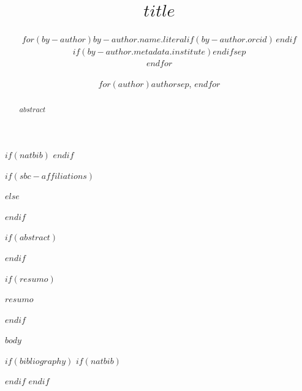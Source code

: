 \documentclass[12pt]{article}
\title{$title$}
\author{$for(by-author)$$by-author.name.literal$$if(by-author.orcid)$\,\orcidlink{$by-author.orcid$}$endif$$if(by-author.metadata.institute)$\inst{$by-author.metadata.institute$}$endif$$sep$\\
$endfor$}
\author{$for(author)$$author$$sep$, $endfor$}
\makeatletter
\let\quartosbcnatbiblbibitem\@lbibitem
\makeatother
\begin{document}
$if(natbib)$
\makeatletter
\let\@lbibitem\quartosbcnatbiblbibitem
\makeatother
$endif$

$if(sbc-affiliations)$
\maketitle
$else$
{\renewcommand{\inst}[1]{}\maketitle}
$endif$

$if(abstract)$
\begin{abstract}
$abstract$
\end{abstract}
$endif$

$if(resumo)$
\begin{resumo}
$resumo$
\end{resumo}
$endif$

$body$

$if(bibliography)$
$if(natbib)$


$endif$
$endif$
\end{document}

